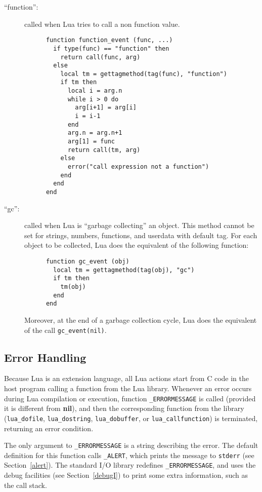 \documentclass[11pt]{article}
\newcommand{\See}[1]{Section~\ref{#1}}
\newcommand{\see}[1]{(see \See{#1})}
\newcommand{\nil}{{\bf nil}}
\newcommand{\Deffunc}[1]{\index{#1}}
\begin{document}
\begin{description}
\item[``function'':]
called when Lua tries to call a non function value.
\begin{verbatim}
      function function_event (func, ...)
        if type(func) == "function" then
          return call(func, arg)
        else
          local tm = gettagmethod(tag(func), "function")
          if tm then
            local i = arg.n
            while i > 0 do
              arg[i+1] = arg[i]
              i = i-1
            end
            arg.n = arg.n+1
            arg[1] = func
            return call(tm, arg)
          else
            error("call expression not a function")
          end
        end
      end
\end{verbatim}

\item[``gc'':]
called when Lua is ``garbage collecting'' an object.
This method cannot be set for strings, numbers, functions,
and userdata with default tag.
For each object to be collected,
Lua does the equivalent of the following function:
\begin{verbatim}
      function gc_event (obj)
        local tm = gettagmethod(tag(obj), "gc")
        if tm then
          tm(obj)
        end
      end
\end{verbatim}
Moreover, at the end of a garbage collection cycle,
Lua does the equivalent of the call \verb|gc_event(nil)|.

\end{description}



\subsection{Error Handling} \label{error}

Because Lua is an extension language,
all Lua actions start from C code in the host program
calling a function from the Lua library.
Whenever an error occurs during Lua compilation or execution,
function \verb|_ERRORMESSAGE| is called \Deffunc{_ERRORMESSAGE}
(provided it is different from \nil),
and then the corresponding function from the library
(\verb|lua_dofile|, \verb|lua_dostring|,
\verb|lua_dobuffer|, or \verb|lua_callfunction|)
is terminated, returning an error condition.

The only argument to \verb|_ERRORMESSAGE| is a string
describing the error.
The default definition for this function calls \verb|_ALERT|,
which prints the message to \verb|stderr| \see{alert}.
The standard I/O library redefines \verb|_ERRORMESSAGE|,
and uses the debug facilities \see{debugI}
to print some extra information,
such as the call stack.
\end{document}
